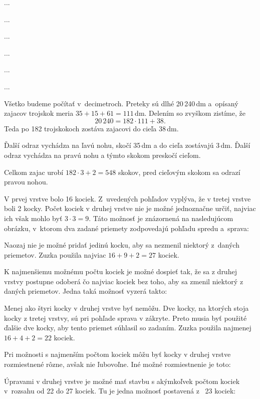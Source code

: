 ﻿{%
...}

{%
...}

{%
...}

{%
...}

{%
...}

{%
...}

{%
Všetko budeme počítať v~decimetroch.
Preteky sú dlhé 20\,240\,dm a~opísaný zajacov trojskok meria $35 + 15 + 61 = 111$\,dm.
Delením so zvyškom zistíme, že
$$
20\,240 = 182 \cdot 111 + 38 .
$$
Teda po 182 trojskokoch zostáva zajacovi do cieľa 38\,dm.

Ďalší odraz vychádza na ľavú nohu, skočí 35\,dm a do cieľa zostávajú 3\,dm.
Ďalší odraz vychádza na pravú nohu a týmto skokom preskočí cieľom.

Celkom zajac urobí $182\cdot3 + 2 = 548$ skokov, pred cieľovým skokom sa odrazí pravou nohou.
}

{%
V prvej vrstve bolo 16 kociek.
Z~uvedených pohľadov vyplýva, že v tretej vrstve boli 2 kocky.
Počet kociek v druhej vrstve nie je možné jednoznačne určiť, najviac ich však mohlo byť $3\cdot3=9$.
Táto možnosť je znázornená na nasledujúcom obrázku, v~ktorom dva zadané priemety zodpovedajú pohľadu spredu a~sprava:
%


\noindent
Naozaj nie je možné pridať jedinú kocku, aby sa nezmenil niektorý z~daných priemetov.
Zuzka použila najviac $16+9+2 =27$ kociek.

K najmenšiemu možnému počtu kociek je možné dospieť tak, že sa z druhej vrstvy postupne odoberá čo najviac kociek bez toho, aby sa zmenil niektorý z daných priemetov.
Jedna taká možnosť vyzerá takto:
%


\noindent
Menej ako štyri kocky v druhej vrstve byť nemôžu.
Dve kocky, na ktorých stoja kocky z tretej vrstvy, sú pri pohľade sprava v zákryte.
Preto musia byť použité ďalšie dve kocky, aby tento priemet súhlasil so zadaním.
Zuzka použila najmenej $16+4+2 =22$ kociek.

\poznamka
Pri možnosti s najmenším počtom kociek môžu byť kocky v druhej vrstve rozmiestnené rôzne, avšak nie ľubovoľne.
Iné možné rozmiestnenie je toto:
%


Úpravami v druhej vrstve je možné mať stavbu s akýmkoľvek počtom kociek v~rozsahu od 22 do 27 kociek.
Tu je jedna možnosť postavená z ~23 kociek:
%


}

